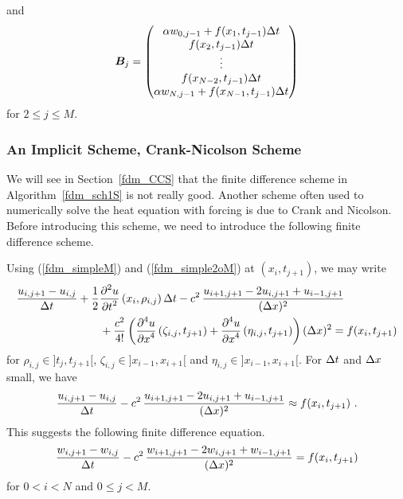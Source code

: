 and
\[
\bm{B}_j = \begin{pmatrix}
\alpha w_{0,j-1} + f(x_1,t_{j-1}) \Delta{t} \\
f(x_2,t_{j-1}) \Delta{t} \\
\vdots \\
f(x_{N-2},t_{j-1}) \Delta{t} \\
\alpha w_{N,j-1} + f(x_{N-1},t_{j-1}) \Delta{t}
\end{pmatrix}
\]
for $2\leq j \leq M$.

\subsubsection{An Implicit Scheme,  Crank-Nicolson Scheme}

We will see in Section~\ref{fdm_CCS} that the finite difference scheme
in Algorithm~\ref{fdm_sch1S} is not really good.  Another scheme often used
to numerically solve the heat equation with forcing is due to Crank
and Nicolson.  Before introducing this scheme, we need to introduce
the following finite difference scheme.

Using (\ref{fdm_simpleM}) and (\ref{fdm_simple2oM}) at
$(x_i,t_{j+1})$, we may write
\begin{align*}
\frac{u_{i,j+1}- u_{i,j}}{\Delta{t}} &+
\frac{1}{2} \frac{\displaystyle \partial^{2}{u}} {\displaystyle \partial{t}^{2}}\left(x_i,\rho_{i,j}\right) \Delta{t} - c^2 \,
\frac{u_{i+1,j+1} - 2u_{i,j+1} + u_{i-1,j+1}}{(\Delta{x})^2} \\
& \quad\quad + \frac{c^2}{4!}
\left( \frac{\displaystyle \partial^{4}{u}} {\displaystyle \partial{x}^{4}}\left(\zeta_{i,j},t_{j+1}\right)
+ \frac{\displaystyle \partial^{4}{u}} {\displaystyle \partial{x}^{4}}\left(\eta_{i,j},t_{j+1}\right) \right) (\Delta{x})^2
= f(x_i,t_{j+1})
\end{align*}
for $\rho_{i,j} \in ]t_j,t_{j+1}[$, $\zeta_{i,j} \in ]x_{i-1},x_{i+1}[$ and
$\eta_{i,j} \in ]x_{i-1},x_{i+1}[$.  For $\Delta{t}$ and $\Delta{x}$ small,
we have
\[
\frac{u_{i,j+1}- u_{i,j}}{\Delta{t}} - c^2 \,
\frac{u_{i+1,j+1} - 2u_{i,j+1} + u_{i-1,j+1}}{(\Delta{x})^2}
\approx f(x_i,t_{j+1}) \ .
\]
This suggests the following finite difference equation.
\begin{equation} \label{fdm_sch1M}
\frac{w_{i,j+1}- w_{i,j}}{\Delta{t}} - c^2 \,
\frac{w_{i+1,j+1} - 2w_{i,j+1} + w_{i-1,j+1}}{(\Delta{x})^2} = f(x_i,t_{j+1})
\end{equation}
for $0 < i <N$ and $0 \leq j < M$.

